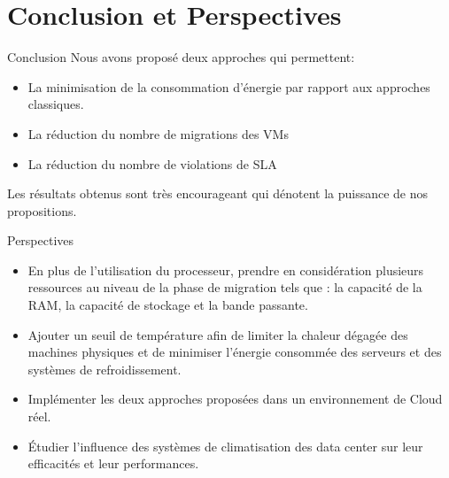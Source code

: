\documentclass[xcolor=dvipsnames]{beamer}
\begin{document}
\section{Conclusion et Perspectives}


\begin{frame}
\begin{center}
\begin{block}{Conclusion}
Nous avons proposé deux approches qui permettent:
\begin{itemize}
\item  La minimisation de la consommation d'énergie par rapport aux approches classiques.
\item La réduction du nombre de migrations des VMs
\item La réduction du nombre de violations de SLA
\end{itemize}
\vspace{0.5cm}
Les résultats obtenus sont très encourageant qui dénotent la puissance de nos propositions.
\end{block}
\end{center}
\end{frame}


\begin{frame}
\begin{center}
\begin{block}{Perspectives}
\begin{itemize}
\item En plus de l'utilisation du processeur, prendre en considération   plusieurs ressources au niveau de la phase de migration tels que : la capacité de la RAM, la capacité de stockage et la bande passante.
\item Ajouter un seuil de température afin de limiter la chaleur dégagée des machines physiques et de minimiser l'énergie consommée des serveurs et des systèmes de refroidissement.
\item Implémenter les deux approches proposées dans un environnement de Cloud réel.
\item Étudier l'influence des systèmes de climatisation des data center sur leur efficacités et leur performances.



\end{itemize}
\end{block}
\end{center}
\end{frame}
\end{document}
